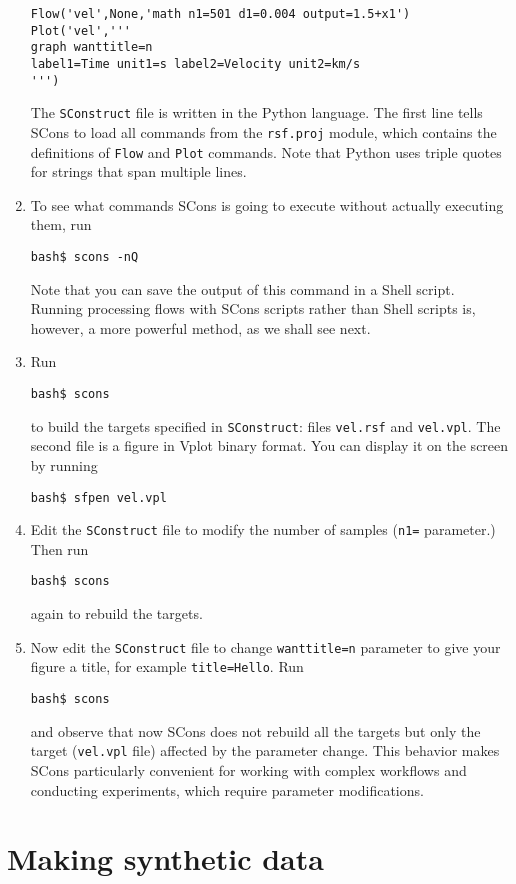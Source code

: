 \begin{enumerate}
\begin{lstlisting}[frame=single]
Flow('vel',None,'math n1=501 d1=0.004 output=1.5+x1')
Plot('vel','''
graph wanttitle=n 
label1=Time unit1=s label2=Velocity unit2=km/s
''')
\end{lstlisting}
The \texttt{SConstruct} file is written in the Python language.
The first line tells SCons to load all commands from the \texttt{rsf.proj} module, which contains the definitions of \texttt{Flow} and \texttt{Plot} commands. Note that Python uses triple quotes for strings that span multiple lines.
\item To see what commands SCons is going to execute without actually executing them, run
\begin{verbatim}
bash$ scons -nQ
\end{verbatim}
Note that you can save the output of this command in a Shell script. Running processing flows with SCons scripts rather than Shell scripts is, however, a more powerful method, as we shall see next.
\item Run 
\begin{verbatim}
bash$ scons
\end{verbatim}
to build the targets specified in \texttt{SConstruct}: files \texttt{vel.rsf} and \texttt{vel.vpl}. The second file is a figure in Vplot binary format. You can display it on the screen by running
\begin{verbatim}
bash$ sfpen vel.vpl
\end{verbatim}
\item Edit the \texttt{SConstruct} file to modify the number of samples (\texttt{n1=}  parameter.) Then run 
\begin{verbatim}
bash$ scons
\end{verbatim}
again to rebuild the targets.
\item Now edit the \texttt{SConstruct} file to change \texttt{wanttitle=n} parameter to give your figure a title, for example \texttt{title=Hello}. Run 
\begin{verbatim}
bash$ scons
\end{verbatim}
and observe that now SCons does not rebuild all the targets but only
the target (\texttt{vel.vpl} file) affected by the parameter
change. This behavior makes SCons particularly convenient for working
with complex workflows and conducting experiments, which require
parameter modifications.
\end{enumerate}

\section{Making synthetic data}

